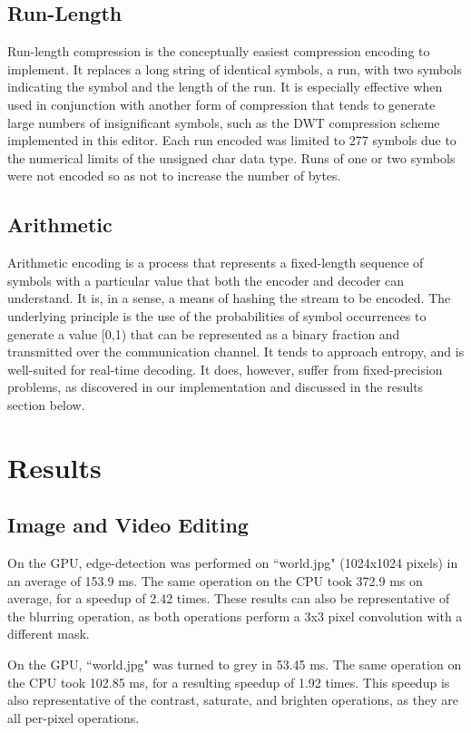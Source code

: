 \documentclass[10pt,twocolumn,twoside]{IEEEtran}
\begin{document}
\subsection{Run-Length}
Run-length compression is the conceptually easiest compression encoding to implement. It replaces a long string of identical symbols, a run, with two symbols indicating the symbol and the length of the run. It is especially effective when used in conjunction with another form of compression that tends to generate large numbers of insignificant symbols, such as the DWT compression scheme implemented in this editor. Each run encoded was limited to 277 symbols due to the numerical limits of the unsigned char data type. Runs of one or two symbols were not encoded so as not to increase the number of bytes.

\subsection{Arithmetic}
Arithmetic encoding is a process that represents a fixed-length sequence of symbols with a particular value that both the encoder and decoder can understand. It is, in a sense, a means of hashing the stream to be encoded. The underlying principle is the use of the probabilities of symbol occurrences to generate a value [0,1) that can be represented as a binary fraction and transmitted over the communication channel. It tends to approach entropy, and is well-suited for real-time decoding. It does, however, suffer from fixed-precision problems, as discovered in our implementation and discussed in the results section below.

\section{Results}

\subsection{Image and Video Editing}
On the GPU, edge-detection was performed on ``world.jpg" (1024x1024 pixels) in an average of 153.9 ms. The same operation on the CPU took 372.9 ms on average, for a speedup of 2.42 times. These results can also be representative of the blurring operation, as both operations perform a 3x3 pixel convolution with a different mask.

On the GPU, ``world.jpg" was turned to grey in 53.45 ms. The same operation on the CPU took 102.85 ms, for a resulting speedup of 1.92 times. This speedup is also representative of the contrast, saturate, and brighten operations, as they are all per-pixel operations.
\end{document}
